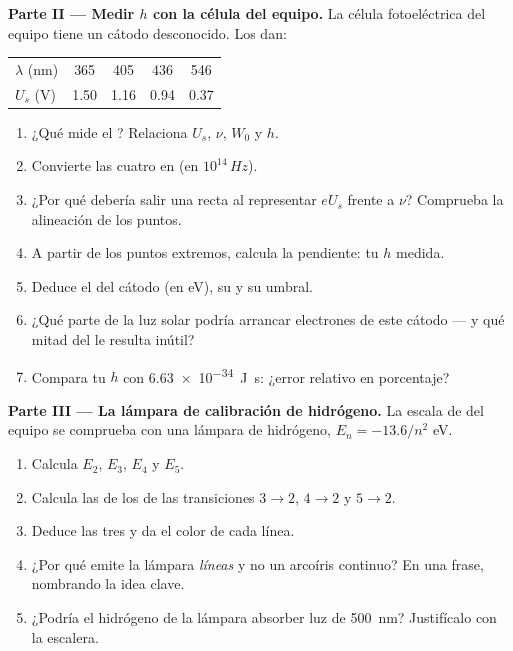 \begin{problem}
\medskip
\noindent\textbf{Parte II --- Medir $h$ con la célula del equipo.}
La célula fotoeléctrica del equipo tiene un cátodo desconocido. Los  dan:
\begin{center}\small
\begin{tabular}{lcccc}
$\lambda$ (\unit{nm}) & 365 & 405 & 436 & 546\\
$U_s$ (\unit{V}) & 1.50 & 1.16 & 0.94 & 0.37
\end{tabular}
\end{center}
\begin{enumerate}[resume]
  \item ¿Qué mide el ? Relaciona $U_s$, $\nu$, $W_0$ y $h$.
  \item Convierte las cuatro  en  (en
        $10^{14}\,\unit{Hz}$).
  \item ¿Por qué debería salir una recta al representar $eU_s$ frente a $\nu$?
        Comprueba la alineación de los puntos.
  \item A partir de los puntos extremos, calcula la pendiente: tu $h$ medida.
  \item Deduce el  del cátodo (en \unit{eV}), su  y su  umbral.
  \item ¿Qué parte de la luz solar podría arrancar electrones de este cátodo --- y qué
        mitad del  le resulta inútil?
  \item Compara tu $h$ con \qty{6.63e-34}{J.s}: ¿error relativo en porcentaje?
\end{enumerate}

\medskip
\noindent\textbf{Parte III --- La lámpara de calibración de hidrógeno.}
La escala de  del equipo se comprueba con una lámpara de hidrógeno,
$E_n = -13.6/n^2$ \unit{eV}.
\begin{enumerate}[resume]
  \item Calcula $E_2$, $E_3$, $E_4$ y $E_5$.
  \item Calcula las  de los  de las transiciones $3 \to 2$, $4 \to 2$ y
        $5 \to 2$.
  \item Deduce las tres  y da el color de cada línea.
  \item ¿Por qué emite la lámpara \emph{líneas} y no un arcoíris continuo? En una
        frase, nombrando la idea clave.
  \item ¿Podría el hidrógeno de la lámpara absorber luz de \qty{500}{nm}? Justifícalo
        con la escalera.
\end{enumerate}


\end{problem}

